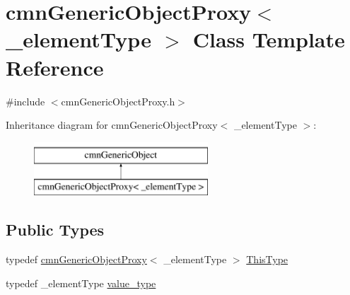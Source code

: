 \hypertarget{classcmn_generic_object_proxy}{}\section{cmn\+Generic\+Object\+Proxy$<$ \+\_\+element\+Type $>$ Class Template Reference}
\label{classcmn_generic_object_proxy}


{\ttfamily \#include $<$cmn\+Generic\+Object\+Proxy.\+h$>$}

Inheritance diagram for cmn\+Generic\+Object\+Proxy$<$ \+\_\+element\+Type $>$\+:\begin{figure}[H]
\begin{center}
\leavevmode
\includegraphics[height=2.000000cm]{d1/de4/classcmn_generic_object_proxy}
\end{center}
\end{figure}
\subsection*{Public Types}
\begin{DoxyCompactItemize}
\item 
typedef \hyperlink{classcmn_generic_object_proxy}{cmn\+Generic\+Object\+Proxy}$<$ \+\_\+element\+Type $>$ \hyperlink{classcmn_generic_object_proxy_a4ad0391ca48ebfb86d6bbda89a98c99d}{This\+Type}
\item 
typedef \+\_\+element\+Type \hyperlink{classcmn_generic_object_proxy_a5a3db96e5acd73055d5d34c25c1635f3}{value\+\_\+type}
\end{DoxyCompactItemize}
